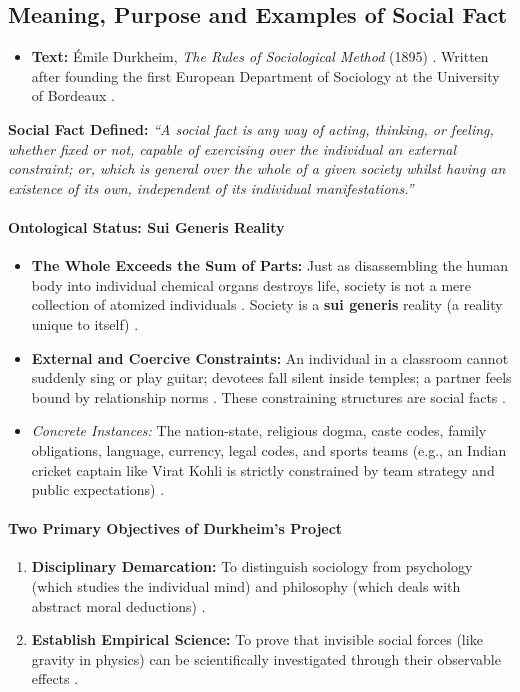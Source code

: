 \subsection{Meaning, Purpose and Examples of Social Fact}
\begin{itemize}
    \item \textbf{Text:} Émile Durkheim, \textit{The Rules of Sociological Method} (1895) . Written after founding the first European Department of Sociology at the University of Bordeaux .
\end{itemize}

\begin{KeyConcept}
\textbf{Social Fact Defined:} \textit{``A social fact is any way of acting, thinking, or feeling, whether fixed or not, capable of exercising over the individual an external constraint; or, which is general over the whole of a given society whilst having an existence of its own, independent of its individual manifestations.''} 
\end{KeyConcept}

\paragraph{Ontological Status: Sui Generis Reality}
\begin{itemize}
    \item \textbf{The Whole Exceeds the Sum of Parts:} Just as disassembling the human body into individual chemical organs destroys life, society is not a mere collection of atomized individuals . Society is a \textbf{sui generis} reality (a reality unique to itself) .
    \item \textbf{External and Coercive Constraints:} An individual in a classroom cannot suddenly sing or play guitar; devotees fall silent inside temples; a partner feels bound by relationship norms . These constraining structures are social facts .
    \item \textit{Concrete Instances:} The nation-state, religious dogma, caste codes, family obligations, language, currency, legal codes, and sports teams (e.g., an Indian cricket captain like Virat Kohli is strictly constrained by team strategy and public expectations) .
\end{itemize}

\paragraph{Two Primary Objectives of Durkheim's Project}
\begin{enumerate}
    \item \textbf{Disciplinary Demarcation:} To distinguish sociology from psychology (which studies the individual mind) and philosophy (which deals with abstract moral deductions) .
    \item \textbf{Establish Empirical Science:} To prove that invisible social forces (like gravity in physics) can be scientifically investigated through their observable effects .
\end{enumerate}

